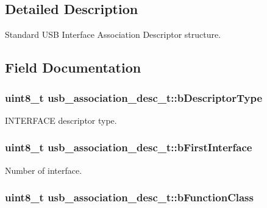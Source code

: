 \subsection{\-Detailed \-Description}
\-Standard \-U\-S\-B \-Interface \-Association \-Descriptor structure. 

\subsection{\-Field \-Documentation}
\hypertarget{structusb__association__desc__t_a5ffca50476ae4206a7ce2e4e896f5efe}{
\subsubsection[{b\-Descriptor\-Type}]{\setlength{\rightskip}{0pt plus 5cm}uint8\-\_\-t {\bf usb\-\_\-association\-\_\-desc\-\_\-t\-::b\-Descriptor\-Type}}}
\label{structusb__association__desc__t_a5ffca50476ae4206a7ce2e4e896f5efe}


\-I\-N\-T\-E\-R\-F\-A\-C\-E descriptor type. 

\hypertarget{structusb__association__desc__t_ac40074d8093e2be0f98b7513fb3e42f8}{
\subsubsection[{b\-First\-Interface}]{\setlength{\rightskip}{0pt plus 5cm}uint8\-\_\-t {\bf usb\-\_\-association\-\_\-desc\-\_\-t\-::b\-First\-Interface}}}
\label{structusb__association__desc__t_ac40074d8093e2be0f98b7513fb3e42f8}


\-Number of interface. 

\hypertarget{structusb__association__desc__t_af2f295c5ccf362d8db46b712549e467a}{
\subsubsection[{b\-Function\-Class}]{\setlength{\rightskip}{0pt plus 5cm}uint8\-\_\-t {\bf usb\-\_\-association\-\_\-desc\-\_\-t\-::b\-Function\-Class}}}
\label{structusb__association__desc__t_af2f295c5ccf362d8db46b712549e467a}


